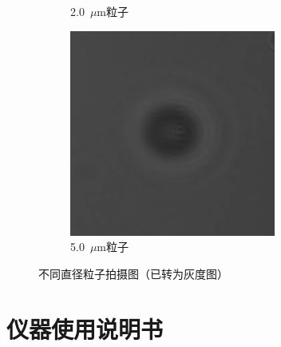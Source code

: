 \documentclass[a4paper]{report} %
\begin{document}
\begin{figure}[H]
\begin{subfigure}{0.3\textwidth}
        \caption{2.0~$\mu$m粒子}
    \end{subfigure}
    \begin{subfigure}{0.3\textwidth}
        \includegraphics[width=\linewidth]{5um.png}
        \caption{5.0~$\mu$m粒子}
    \end{subfigure}

    \caption{不同直径粒子拍摄图（已转为灰度图）}
\end{figure}

\section{仪器使用说明书}



\end{document}
